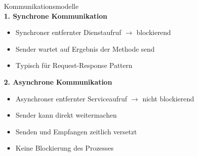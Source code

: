 \begin{concept}{Kommunikationsmodelle}\\
\textbf{1. Synchrone Kommunikation}
\begin{itemize}
    \item Synchroner entfernter Dienstaufruf $\rightarrow$ blockierend
    \item Sender wartet auf Ergebnis der Methode send
    \item Typisch für Request-Response Pattern
\end{itemize}

\textbf{2. Asynchrone Kommunikation}
\begin{itemize}
    \item Asynchroner entfernter Serviceaufruf $\rightarrow$ nicht blockierend
    \item Sender kann direkt weitermachen
    \item Senden und Empfangen zeitlich versetzt
    \item Keine Blockierung des Prozesses
\end{itemize}
\end{concept}



